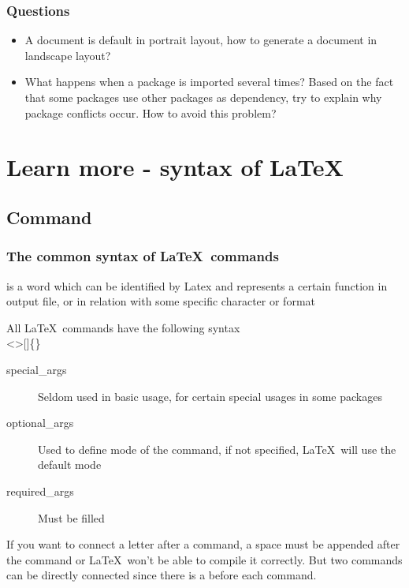\begin{frame}
	\frametitle{Questions}
	\begin{itemize}
		\item A document is default in portrait layout, how to generate a document in landscape layout?
		\item What happens when a package is imported several times? Based on the fact that some packages use other packages as dependency, try to explain why package conflicts occur. How to avoid this problem?

	\end{itemize}
\end{frame}


\section{Learn more - syntax of \LaTeX}

\begin{frame}
\end{frame}

\subsection{Command}

\begin{frame}
	\frametitle{The common syntax of \LaTeX\ commands}
	\begin{definition}
		 is a word which can be identified by Latex and represents a certain function in output file, or in relation with some specific character or format
	\end{definition}
	All \LaTeX\ commands have the following syntax\\
	\textless {}\textgreater []\{\}
	\begin{description}
		\item[special\_args]	Seldom used in basic usage, for certain special usages in some packages
		\item[optional\_args]	Used to define mode of the command, if not specified, \LaTeX\ will use the default mode
		\item[required\_args]	Must be filled
	\end{description}
	If you want to connect a letter after a command, a space must be appended after the command or \LaTeX\ won't be able to compile it correctly. But two commands can be directly connected since there is a \structure{\textbackslash} before each command.
\end{frame}

